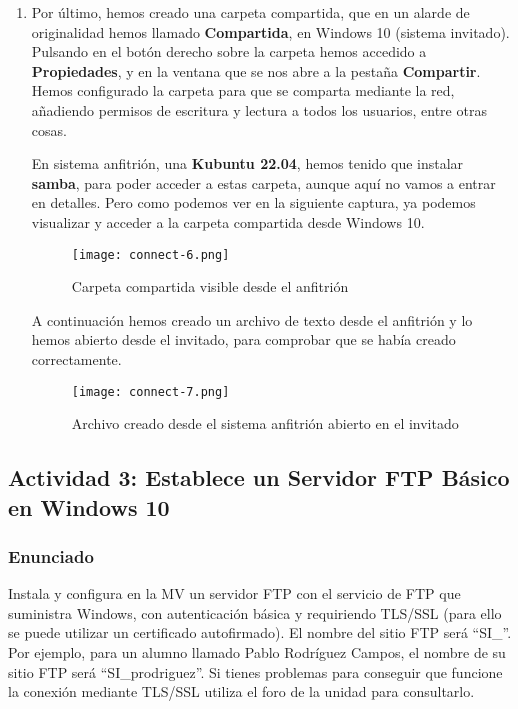\begin{enumerate}
    \item Por último, hemos creado una carpeta compartida, que en un alarde de originalidad hemos llamado \textbf{Compartida}, en Windows 10 (sistema invitado). Pulsando en el botón derecho sobre la carpeta hemos accedido a \textbf{Propiedades}, y en la ventana que se nos abre a la pestaña \textbf{Compartir}. Hemos configurado la carpeta para que se comparta mediante la red, añadiendo permisos de escritura y lectura a todos los usuarios, entre otras cosas.

    En sistema anfitrión, una \textbf{Kubuntu 22.04}, hemos tenido que instalar \textbf{samba}, para poder acceder a estas carpeta, aunque aquí no vamos a entrar en detalles. Pero como podemos ver en la siguiente captura, ya podemos visualizar y acceder a la carpeta compartida desde Windows 10.

    \begin{figure}[H]
        \centering
        \texttt{[image: connect-6.png]}
        \caption{Carpeta compartida visible desde el anfitrión}
    \end{figure}

    A continuación hemos creado un archivo de texto desde el anfitrión y lo hemos abierto desde el invitado, para comprobar que se había creado correctamente.

    \begin{figure}[H]
        \centering
        \texttt{[image: connect-7.png]}
        \caption{Archivo creado desde el sistema anfitrión abierto en el invitado}
    \end{figure}
\end{enumerate}

\subsection{Actividad 3: Establece un Servidor FTP Básico en Windows 10}

\subsubsection{Enunciado}
Instala y configura en la MV un servidor FTP con el servicio de FTP que suministra Windows, con autenticación básica y requiriendo TLS/SSL (para ello se puede utilizar un certificado autofirmado). El nombre del sitio FTP será ``SI\_<inicial de tu nombre y primer apellido>''. Por ejemplo, para un alumno llamado Pablo Rodríguez Campos, el nombre de su sitio FTP será ``SI\_prodriguez''. Si tienes problemas para conseguir que funcione la conexión mediante TLS/SSL utiliza el foro de la unidad para consultarlo.


